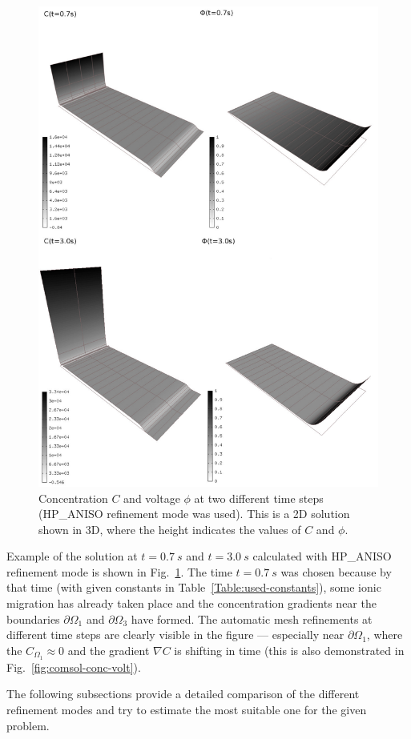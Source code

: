 \begin{figure}[!ht]
  \begin{centering}
  \includegraphics[width=.75\columnwidth]{cphi}
  \caption{\label{fig:cphi} Concentration $C$
  and voltage $\phi$ at two different time steps
  (HP\_ANISO refinement mode was used). This is a 2D solution shown
  in 3D, where the height indicates the values of $C$ and $\phi$.}
  \end{centering}
\end{figure}
Example of the solution at $t=0.7\ s$ and $t=3.0\ s$ 
calculated with HP\_ANISO refinement mode is shown
in Fig.~\ref{fig:cphi}. The time $t=0.7\ s$ was chosen because
by that time (with given constants in Table~\ref{Table:used-constants}),
some ionic migration has already taken place and
the concentration gradients near the boundaries $\partial\Omega_1$ and
$\partial\Omega_3$ have formed. The automatic mesh refinements
at different time steps are clearly visible in the figure --- especially
near $\partial\Omega_1$, where the $C_{\Omega_1}\approx 0$ and
the gradient $\nabla C$ is
shifting in time (this is also demonstrated in Fig.~\ref{fig:comsol-conc-volt}).

The following subsections provide a detailed comparison of
the different refinement modes and try to estimate the most suitable
one for the given problem.

